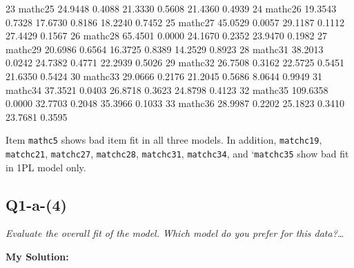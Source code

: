 \documentclass[
]{article}
\newenvironment{Shaded}{\begin{snugshade}}{\end{snugshade}}
\newcommand{\DecValTok}[1]{\textcolor[rgb]{0.00,0.00,0.81}{#1}}
\newcommand{\FloatTok}[1]{\textcolor[rgb]{0.00,0.00,0.81}{#1}}
\newcommand{\NormalTok}[1]{#1}
\begin{document}
\begin{Shaded}
\begin{Highlighting}[]
\DecValTok{23}\NormalTok{ mathc25  }\FloatTok{24.9448} \FloatTok{0.4088} \FloatTok{21.3330} \FloatTok{0.5608} \FloatTok{21.4360} \FloatTok{0.4939}
\DecValTok{24}\NormalTok{ mathc26  }\FloatTok{19.3543} \FloatTok{0.7328} \FloatTok{17.6730} \FloatTok{0.8186} \FloatTok{18.2240} \FloatTok{0.7452}
\DecValTok{25}\NormalTok{ mathc27  }\FloatTok{45.0529} \FloatTok{0.0057} \FloatTok{29.1187} \FloatTok{0.1112} \FloatTok{27.4429} \FloatTok{0.1567}
\DecValTok{26}\NormalTok{ mathc28  }\FloatTok{65.4501} \FloatTok{0.0000} \FloatTok{24.1670} \FloatTok{0.2352} \FloatTok{23.9470} \FloatTok{0.1982}
\DecValTok{27}\NormalTok{ mathc29  }\FloatTok{20.6986} \FloatTok{0.6564} \FloatTok{16.3725} \FloatTok{0.8389} \FloatTok{14.2529} \FloatTok{0.8923}
\DecValTok{28}\NormalTok{ mathc31  }\FloatTok{38.2013} \FloatTok{0.0242} \FloatTok{24.7382} \FloatTok{0.4771} \FloatTok{22.2939} \FloatTok{0.5026}
\DecValTok{29}\NormalTok{ mathc32  }\FloatTok{26.7508} \FloatTok{0.3162} \FloatTok{22.5725} \FloatTok{0.5451} \FloatTok{21.6350} \FloatTok{0.5424}
\DecValTok{30}\NormalTok{ mathc33  }\FloatTok{29.0666} \FloatTok{0.2176} \FloatTok{21.2045} \FloatTok{0.5686}  \FloatTok{8.0644} \FloatTok{0.9949}
\DecValTok{31}\NormalTok{ mathc34  }\FloatTok{37.3521} \FloatTok{0.0403} \FloatTok{26.8718} \FloatTok{0.3623} \FloatTok{24.8798} \FloatTok{0.4123}
\DecValTok{32}\NormalTok{ mathc35 }\FloatTok{109.6358} \FloatTok{0.0000} \FloatTok{32.7703} \FloatTok{0.2048} \FloatTok{35.3966} \FloatTok{0.1033}
\DecValTok{33}\NormalTok{ mathc36  }\FloatTok{28.9987} \FloatTok{0.2202} \FloatTok{25.1823} \FloatTok{0.3410} \FloatTok{23.7681} \FloatTok{0.3595}
\end{Highlighting}
\end{Shaded}

Item \texttt{mathc5} shows bad item fit in all three models. In
addition, \texttt{matchc19}, \texttt{matchc21}, \texttt{matchc27},
\texttt{matchc28}, \texttt{matchc31}, \texttt{matchc34}, and
`\texttt{matchc35} show bad fit in 1PL model only.

\hypertarget{q1-a-4}{%
\subsection{Q1-a-(4)}\label{q1-a-4}}

\emph{Evaluate the overall fit of the model. Which model do you prefer
for this data?\ldots{}}

\textbf{My Solution:}
\end{document}

